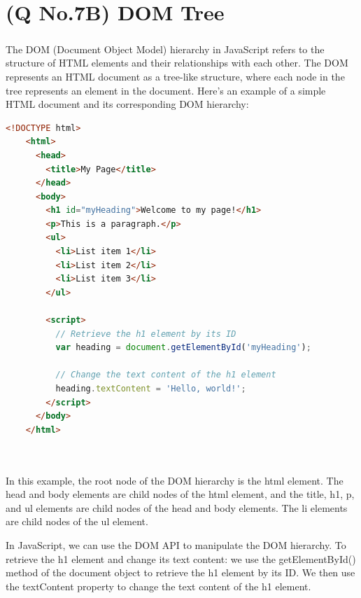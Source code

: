 \documentclass[11pt]{article}
\begin{document}
\section{(Q No.7B) DOM Tree}
\subparagraph{}
The DOM (Document Object Model) hierarchy in JavaScript refers to the structure of HTML elements and their relationships with each other. The DOM represents an HTML document as a tree-like structure, where each node in the tree represents an element in the document. Here's an example of a simple HTML document and its corresponding DOM hierarchy:
\begin{lstlisting}[language=html]
    <!DOCTYPE html>
    <html>
      <head>
        <title>My Page</title>
      </head>
      <body>
        <h1 id="myHeading">Welcome to my page!</h1>
        <p>This is a paragraph.</p>
        <ul>
          <li>List item 1</li>
          <li>List item 2</li>
          <li>List item 3</li>
        </ul>
        
        <script>
          // Retrieve the h1 element by its ID
          var heading = document.getElementById('myHeading');
          
          // Change the text content of the h1 element
          heading.textContent = 'Hello, world!';
        </script>
      </body>
    </html>
    
    
\end{lstlisting}
In this example, the root node of the DOM hierarchy is the html element. The head and body elements are child nodes of the html element, and the title, h1, p, and ul elements are child nodes of the head and body elements. The li elements are child nodes of the ul element.

In JavaScript, we can use the DOM API to manipulate the DOM hierarchy. To retrieve the h1 element and change its text content:
we use the getElementById() method of the document object to retrieve the h1 element by its ID. We then use the textContent property to change the text content of the h1 element.
\end{document}
